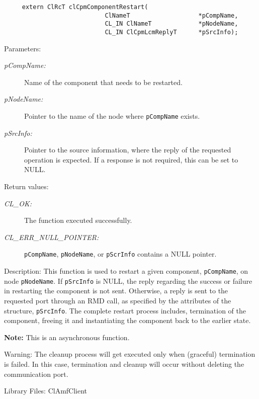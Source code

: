 {\begin{Desc}
\footnotesize\begin{verbatim}     extern ClRcT clCpmComponentRestart(
                			ClNameT                   *pCompName,
                			CL_IN ClNameT             *pNodeName,
                			CL_IN ClCpmLcmReplyT      *pSrcInfo);
\end{verbatim}
\normalsize
\end{Desc}
\begin{Desc}
\item[Parameters:]
\begin{description}
\item[{\em p\-Comp\-Name:}]Name of the component that needs to be restarted. 
\item[{\em p\-Node\-Name:}]Pointer to the name of the node where {\tt{p\-Comp\-Name}} exists. 
\item[{\em p\-Src\-Info:}]Pointer to the source information, where the reply of the requested operation is expected. If a response is not required, this
can be set to NULL.\end{description}
\end{Desc}
\begin{Desc}
\item[Return values:]
\begin{description}
\item[{\em CL\_\-OK:}]The function executed successfully. 
\item[{\em CL\_\-ERR\_\-NULL\_\-POINTER:}]{\tt{p\-Comp\-Name}}, {\tt{p\-Node\-Name}}, or {\tt{p\-Scr\-Info}} contains a NULL pointer.\end{description}
\end{Desc}
\begin{Desc}
\item[Description:]This function is used to restart a given component, {\tt{p\-Comp\-Name}}, on node {\tt{p\-Node\-Name}}. If {\tt{p\-Src\-Info}} is NULL, 
the reply regarding the success or failure in restarting the component is not sent. Otherwise, a reply is sent to the requested port through an RMD call, 
as specified by the attributes of the structure, {\tt{p\-Src\-Info}}. The complete restart process includes, termination of the component, freeing it and 
instantiating the component back to the earlier state.\end{Desc}
{\bf Note:} This is an asynchronous function.

\begin{Desc}
\item[Warning:]The cleanup process will get executed only when (graceful) termination is failed. In this case, termination and cleanup will occur without
deleting the communication port.\end{Desc}
\begin{Desc}
\item[Library Files:]Cl\-Amf\-Client\end{Desc}

}
